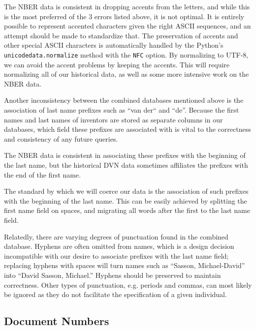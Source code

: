 \documentclass[11pt]{article}
\begin{document}
The NBER data is consistent in dropping accents from the letters, and while
this is the most preferred of the 3 errors listed above, it is not optimal. It
is entirely possible to represent accented characters given the right ASCII
sequences, and an attempt should be made to standardize that. The preservation
of accents and other special ASCII characters is automatically handled by the
Python's \verb`unicodedata.normalize` method with the \verb`NFC` option.  By
normalizing to UTF-8, we can avoid the accent problems by keeping the accents.
This will require normalizing all of our historical data, as well as some more
intensive work on the NBER data.

Another inconsistency between the combined databases mentioned above is the
association of last name prefixes such as ``van der`` and ``de''. Because the
first names and last names of inventors are stored as separate columns in our
databases, which field these prefixes are associated with is vital to the
correctness and consistency of any future queries.

The NBER data is consistent in associating these prefixes with the beginning of
the last name, but the historical DVN data sometimes affiliates the prefixes
with the end of the first name.

The standard by which we will coerce our data is the association of such
prefixes with the beginning of the last name. This can be easily achieved by
splitting the first name field on spaces, and migrating all words after the
first to the last name field.

Relatedly, there are varying degrees of punctuation found in the combined
database.  Hyphens are often omitted from names, which is a design decision
incompatible with our desire to associate prefixes with the last name field;
replacing hyphens with spaces will turn names such as ``Sasson, Michael-David''
into ``David Sasson, Michael.'' Hyphens should be preserved to maintain
correctness. Other types of punctuation, e.g. periods and commas, can most
likely be ignored as they do not facilitate the specification of a given
individual.

\subsection{Document Numbers}
\end{document}
